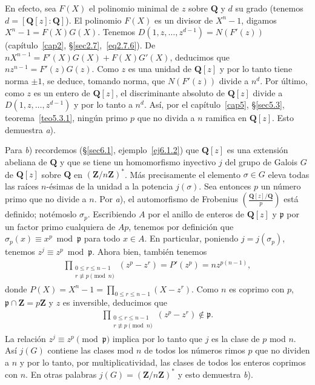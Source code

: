 \documentclass[bibtotoc,leqno,spanish]{amsbook}
\newcommand{\QQ}{\mathbf{Q}}
\newcommand{\ZZ}{\mathbf{Z}}
\newcommand{\idl}[1]{\mathfrak{#1}}
\numberwithin{equation}{section}
\theoremstyle{note}
\theoremstyle{note}
\theoremstyle{rem}
\numberwithin{theorem}{section}
\numberwithin{proposition}{section}
\numberwithin{definition}{section}
\numberwithin{lemma}{section}
\numberwithin{corollary}{section}
\numberwithin{example}{section}
\numberwithin{footnote}{section}%
\begin{document}
En efecto, sea $F(X)$ el polinomio minimal de $z$ sobre $\QQ$ y $d$ su grado
(tenemos $d = [\QQ[z]:\QQ]$). El polinomio $F(X)$ es un divisor de $X^{n}-1$, digamos
$X^{n}-1=F(X)G(X)$. Tenemos $D(1,z,\dots,z^{d-1}) = N(F'(z))$ (cap\'itulo~\ref{cap2}, \S\ref{sec2.7},~\eqref{eq2.7.6}).
De $nX^{n-1}=F'(X)G(X)+F(X)G'(X)$, deducimos que $nz^{n-1}=F'(z)G(z)$. Como $z$ es una unidad de
$\QQ[z]$ y por lo tanto tiene norma $\pm 1$, se deduce, tomando norma, que $N(F'(z))$ divide a $n^{d}$.
Por \'ultimo, como $z$ es un entero de $\QQ[z]$, el discriminante absoluto de $\QQ[z]$ divide a
$D(1,z,\dots,z^{d-1})$ y por lo tanto a $n^{d}$. As\'i, por el cap\'itulo~\ref{cap5}, \S\ref{sec5.3},
teorema~\ref{teo5.3.1},
ning\'un primo $p$ que no divida a $n$ ramifica en $\QQ[z]$. Esto demuestra {\itshape a}).

Para {\itshape b}) recordemos (\S\ref{sec6.1}, ejemplo~\ref{ej6.1.2}) que $\QQ[z]$ es una extensi\'on abeliana de $\QQ$ y
que se tiene un homomorfismo inyectivo $j$ del grupo de Galois $G$ de $\QQ[z]$ sobre $\QQ$ en
$(\ZZ/n\ZZ)^{*}$. M\'as precisamente el elemento $\sigma\in G$ eleva todas las ra\'ices $n$-\'esimas de la
unidad a la potencia $j(\sigma)$. Sea entonces $p$ un n\'umero primo que no divide a $n$. Por {\itshape a}),
el automorfismo de Frobenius $\left(\frac{\QQ[z]/\QQ}{p}\right)$ est\'a definido; not\'emoslo $\sigma_{p}$.
Escribiendo $A$ por el anillo de enteros de $\QQ[z]$ y $\idl{p}$ por un factor primo cualquiera de $Ap$,
tenemos por definici\'on que $\sigma_{p}(x)\equiv x^{p}\bmod\idl{p}$ para todo $x\in A$. En particular, poniendo
$j = j(\sigma_{p})$, tenemos $z^{j}\equiv z^{p}\bmod\idl{p}$. Ahora bien, tambi\'en tenemos
\begin{gather*}
\prod_{\substack{0\leq r\leq n-1\\ r\not\equiv p\pmod n}}(z^{p}-z^{r})=P'(z^{p}) = nz^{p(n-1)},
\end{gather*}
donde $P(X) = X^{n}-1 = \prod_{0\leq r\leq n-1}(X-z^{r})$. Como $n$ es coprimo con $p$,
$\idl{p}\cap\ZZ = p\ZZ$ y $z$ es inversible, deducimos que
\begin{gather*}
\prod_{\substack{0\leq r\leq n-1\\ r\not\equiv p\pmod n}}(z^{p}-z^{r})\notin\idl{p}.
\end{gather*}
La relaci\'on $z^{j}\equiv z^{p}\pmod{\idl{p}}$ implica por lo tanto que $j$ es la clase de $p$
mod $n$. As\'i $j(G)$ contiene las clases mod $n$ de todos los n\'umeros rimos $p$ que no dividen a
$n$ y por lo tanto, por multiplicatividad, las clases de todos los enteros coprimos con $n$. En otras
palabras $j(G) = (\ZZ/n\ZZ)^{*}$ y esto demuestra {\itshape b}).
\end{document}
